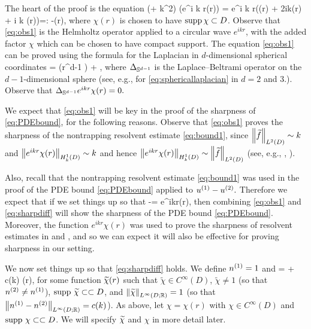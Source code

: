 The heart of the proof is the equation
\beq\label{eq:obs1}
(\Delta + k^2) \big(e^{i k r}\chi(r)\big) =  e^{i k r}\mleft(\Delta \chi(r) + 2ik(r) + i k  \chi(r)\mright)=: -(r),
\eeq
where $\chi(r)$ is chosen to have $\operatorname{supp} \chi \subset D$. Observe that \cref{eq:obs1} is the Helmholtz operator applied to a circular wave $e^{ikr}$, with the added factor $\chi$ which can be chosen to have compact support. The equation \cref{eq:obs1} can be proved using the formula for the Laplacian in $d$-dimensional spherical coordinates
\beq\label{eq:sphericallaplacian}
\Delta \chi =  \mleft(r^{d-1}  \mright) +  \LapBel \chi,
\eeq
where $\Delta_{\mathbb{S}^{d-1}}$ is the Laplace--Beltrami operator on the $d-1$-dimensional sphere (see, e.g., \cite[Equations (17.23) and (17.25)]{RiHoBe:97} for \cref{eq:sphericallaplacian} in $d=2$ and $3.$). Observe that $\Delta_{\mathbb{S}^{d-1}} e^{ikr} \chi(r) = 0.$

We expect that \cref{eq:obs1} will be key in the proof of the sharpness of \cref{eq:PDEbound}, for the following reasons. Observe that \cref{eq:obs1} proves the sharpness of the nontrapping resolvent estimate \cref{eq:bound1}, since $\NLtD{\ftilde}\sim k$ and $\NHokD{e^{ikr}\chi(r)}\sim k$  and hence $\NHokD{e^{ikr}\chi(r)} \sim \NLtD{\ftilde}$ (see, e.g., \cite[Lemma 3.10]{ChMo:08},  \cite[Lemma 4.12]{Sp:14}).

Also, recall that  the nontrapping resolvent estimate \cref{eq:bound1} was used in the proof of the PDE bound \cref{eq:PDEbound} applied to ${u}^{(1)}-{u}^{(2)}.$ Therefore we expect that if we set things up so that
\beq\label{eq:sharpdiff}
\uso-\ust = e^{ikr}\chi(r),
\eeq
then  combining \cref{eq:obs1} and \cref{eq:sharpdiff} will show the sharpness of the PDE bound \cref{eq:PDEbound}. Moreover, the function $e^{ikr} \chi(r)$ was used to prove the sharpness of resolvent estimates in \cite[Discussion on p. 1445 and Lemma 3.10]{ChMo:08} and \cite[Lemma 4.12]{Sp:14}, and so we can expect it will also be effective for proving sharpness in our setting.

We now set things up so that \cref{eq:sharpdiff} holds. We define ${n}^{(1)} = 1$ and
\beq\label{eq:fiddlyntdone}
\nst = \nso + c(k) \chitilde(r),
\eeq
for some function $\widetilde{\chi}(r)$ such that $\widetilde{\chi}\in C^{\infty}(D)$, $\widetilde{\chi}\not = 1$ (so that ${n}^{(2)}\not = {n}^{(1)}$), $\operatorname{supp} \, \widetilde{\chi} \subset\subset D$, and $\NLiDRR{\chitilde} = 1$ (so that $\NLiDRR{\nso-\nst} = c(k)$).   As above, let $\chi=\chi(r)$ with $\chi \in C^{\infty}(D)$ and $\operatorname{supp} \,\chi \subset\subset D$. We will specify $\widetilde{\chi}$ and $\chi$ in more detail later.

